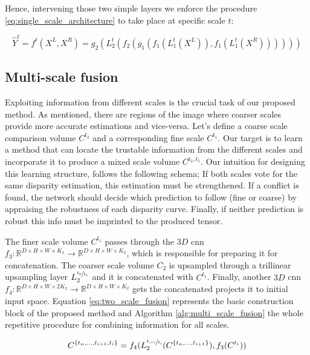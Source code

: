 \documentclass[10pt]{article}
\begin{document}
Hence, intervening those two simple layers we enforce the procedure \ref{eq:single_scale_architecture} to take place at specific scale $t$:

\begin{equation} \label{eq:single_scale_archtecture_at_sigma}
    \hat{Y}^t = f^t(X^L, X^R) = g_2( L_2^t (f_2 ( g_1 ( f_1(L_1^t(X^L)), f_1(L_1^t(X^R)) ) ) ) )
\end{equation}


\subsection{Multi-scale fusion}

Exploiting information from different scales is the crucial task of our proposed method. As mentioned, there are regions of the image where coarser scales provide more accurate estimations and vice-versa. Let's define a coarse scale comparison volume $C^{t_2}$ and a corresponding fine scale $C^{t_1}$. Our target is to learn a method that can locate the trustable information from the different scales and incorporate it to produce a mixed scale volume $C^{t_2, t_1}$. Our intuition for designing this learning structure, follows the following schema; If both scales vote for the same disparity estimation, this estimation must be strengthened. If a conflict is found, the network should decide which prediction to follow (fine or coarse) by appraising the robustness of each disparity curve. Finally, if neither prediction is robust this info must be imprinted to the produced tensor.

The finer scale volume $C^{t_1}$ passes through the $3D$ cnn $f_3: \mathbb{R}^{D \times H \times W \times K_1} \rightarrow  \mathbb{R}^{D \times H \times W \times K_2}$, which is responsible for preparing it for concatenation. The coarser scale volume $C_2$ is upsampled through a trillinear upsampling layer $L_2^{\sfrac{t_2}{t_1}}$ and it is concatenated with $C^{t_1}$. Finally, another $3D$ cnn $f_4: \mathbb{R}^{D \times H \times W \times 2K_2} \rightarrow  \mathbb{R}^{D \times H \times W \times K_2}$ gets the concatenated  projects it to initial input space. Equation \ref{eq:two_scale_fusion} represents the basic construction block of the proposed method and Algorithm \ref{alg:multi_scale_fusion} the whole repetitive procedure for combining information for all scales.

\begin{equation} \label{eq:two_scale_fusion}
C^{ \{ t_n, ..., t_{i+1}, t_{i} \} } = f_4(L_2^{\sfrac{t_{i+1}}{t_i} }(C^{ \{ t_n, ..., t_{i+1} \} }), f_3(C^{t_i}) )
\end{equation}
\end{document}
